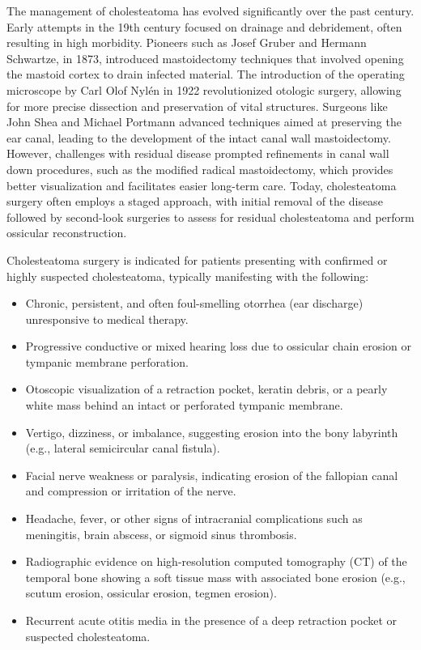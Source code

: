 The management of cholesteatoma has evolved significantly over the past century. Early attempts in the 19th century focused on drainage and debridement, often resulting in high morbidity. Pioneers such as Josef Gruber and Hermann Schwartze, in 1873, introduced mastoidectomy techniques that involved opening the mastoid cortex to drain infected material. The introduction of the operating microscope by Carl Olof Nyl\'{e}n in 1922 revolutionized otologic surgery, allowing for more precise dissection and preservation of vital structures. Surgeons like John Shea and Michael Portmann advanced techniques aimed at preserving the ear canal, leading to the development of the intact canal wall mastoidectomy. However, challenges with residual disease prompted refinements in canal wall down procedures, such as the modified radical mastoidectomy, which provides better visualization and facilitates easier long-term care. Today, cholesteatoma surgery often employs a staged approach, with initial removal of the disease followed by second-look surgeries to assess for residual cholesteatoma and perform ossicular reconstruction.

Cholesteatoma surgery is indicated for patients presenting with confirmed or highly suspected cholesteatoma, typically manifesting with the following:

\begin{itemize}
  \item Chronic, persistent, and often foul-smelling otorrhea (ear discharge) unresponsive to medical therapy.
  \item Progressive conductive or mixed hearing loss due to ossicular chain erosion or tympanic membrane perforation.
  \item Otoscopic visualization of a retraction pocket, keratin debris, or a pearly white mass behind an intact or perforated tympanic membrane.
  \item Vertigo, dizziness, or imbalance, suggesting erosion into the bony labyrinth (e.g., lateral semicircular canal fistula).
  \item Facial nerve weakness or paralysis, indicating erosion of the fallopian canal and compression or irritation of the nerve.
  \item Headache, fever, or other signs of intracranial complications such as meningitis, brain abscess, or sigmoid sinus thrombosis.
  \item Radiographic evidence on high-resolution computed tomography (CT) of the temporal bone showing a soft tissue mass with associated bone erosion (e.g., scutum erosion, ossicular erosion, tegmen erosion).
  \item Recurrent acute otitis media in the presence of a deep retraction pocket or suspected cholesteatoma.
\end{itemize}

